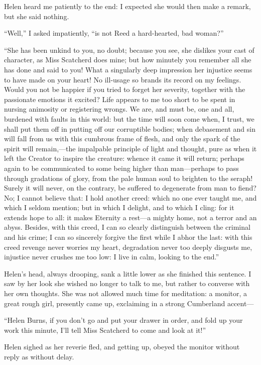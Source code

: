 Helen heard me patiently to the end: I expected she would then make a
remark, but she said nothing.

\enquote{Well,} I asked impatiently, \enquote{is not \Mrs{} Reed a
	hard-hearted, bad woman?}

\enquote{She has been unkind to you, no doubt; because you see, she
	dislikes your cast of character, as Miss Scatcherd does mine; but how
	minutely you remember all she has done and said to you!  What a
	singularly deep impression her injustice seems to have made on your
	heart!  No ill-usage so brands its record on my feelings.  Would you not
	be happier if you tried to forget her severity, together with the
	passionate emotions it excited?  Life appears to me too short to be
	spent in nursing animosity or registering wrongs.  We are, and must be,
	one and all, burdened with faults in this world: but the time will soon
	come when, I trust, we shall put them off in putting off our corruptible
	bodies; when debasement and sin will fall from us with this cumbrous
	frame of flesh, and only the spark of the spirit will remain,---the
	impalpable principle of light and thought, pure as when it left the
	Creator to inspire the creature: whence it came it will return; perhaps
	again to be communicated to some being higher than man---perhaps to pass
	through gradations of glory, from the pale human soul to brighten to the
	seraph!  Surely it will never, on the contrary, be suffered to
	degenerate from man to fiend?  No; I cannot believe that: I hold another
	creed: which no one ever taught me, and which I seldom mention; but in
	which I delight, and to which I cling: for it extends hope to all: it
	makes Eternity a rest---a mighty home, not a terror and an abyss.
	Besides, with this creed, I can so clearly distinguish between the
	criminal and his crime; I can so sincerely forgive the first while I
	abhor the last: with this creed revenge never worries my heart,
	degradation never too deeply disgusts me, injustice never crushes me too
	low: I live in calm, looking to the end.}

Helen's head, always drooping, sank a little lower as she finished this
sentence.  I saw by her look she wished no longer to talk to me, but
rather to converse with her own thoughts.  She was not allowed much time
for meditation: a monitor, a great rough girl, presently came up,
exclaiming in a strong Cumberland accent---

\enquote{Helen Burns, if you don't go and put your drawer in order, and
	fold up your work this minute, I'll tell Miss Scatcherd to come and look
	at it!}

Helen sighed as her reverie fled, and getting up, obeyed the monitor
without reply as without delay.
